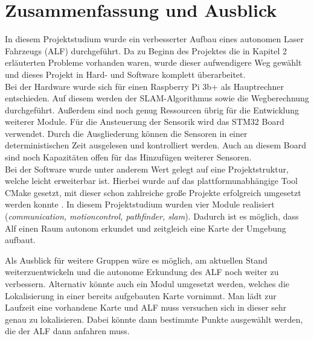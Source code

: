 \chapter{Zusammenfassung und Ausblick}


In diesem Projektstudium wurde ein verbesserter Aufbau eines autonomen Laser Fahrzeugs (ALF) durchgeführt. Da zu Beginn des Projektes die in Kapitel 2 erläuterten Probleme vorhanden waren, wurde dieser aufwendigere Weg gewählt und dieses Projekt in Hard- und Software komplett überarbeitet.\\
Bei der Hardware wurde sich für einen Raspberry Pi 3b+ als Hauptrechner entschieden. Auf diesem werden der SLAM-Algorithmus sowie die Wegberechnung durchgeführt. Außerdem sind noch genug Ressourcen übrig für die Entwicklung weiterer Module. Für die Ansteuerung der Sensorik wird das STM32 Board verwendet. Durch die Ausgliederung können die Sensoren in einer deterministischen Zeit ausgelesen und kontrolliert werden. Auch an diesem Board sind noch Kapazitäten offen für das Hinzufügen weiterer Sensoren.\\
Bei der Software wurde unter anderem Wert gelegt auf eine Projektstruktur, welche leicht erweiterbar ist. Hierbei wurde auf das plattformunabhängige Tool CMake gesetzt, mit dieser schon zahlreiche große Projekte erfolgreich umgesetzt werden konnte \cite{cmake.2018}. In diesem Projektstudium wurden vier Module realisiert (\textit{communication, motioncontrol, pathfinder, slam}). Dadurch ist es möglich, dass Alf einen Raum autonom erkundet und zeitgleich eine Karte der Umgebung aufbaut.

Als Ausblick für weitere Gruppen wäre es möglich, am aktuellen Stand weiterzuentwickeln und die autonome Erkundung des ALF noch weiter zu verbessern. Alternativ könnte auch ein Modul umgesetzt werden, welches die Lokalisierung in einer bereits aufgebauten Karte vornimmt. Man lädt zur Laufzeit eine vorhandene Karte und ALF muss versuchen sich in dieser sehr genau zu lokalisieren. Dabei könnte dann bestimmte Punkte ausgewählt werden, die der ALF dann anfahren muss.
